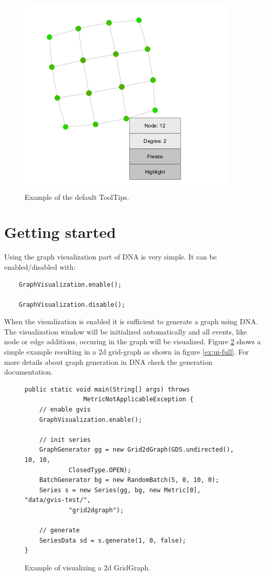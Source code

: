 \begin{figure} [h]
\centering
\includegraphics [scale=0.85] {images/tooltip}
\caption{Example of the default ToolTips.}
\label{fig:ToolTip}
\end{figure}

\section{Getting started}
\label{s:start}
Using the graph visualization part of DNA is very simple. It can be enabled/disabled with:
\begin{lstlisting}
	GraphVisualization.enable();
	
	GraphVisualization.disable();
\end{lstlisting}
When the visualization is enabled it is sufficient to generate a graph using DNA. The visualization window will be initialized automatically and all events, like node or edge additions, occuring in the graph will be visualized. Figure \ref{code:gridGraph} shows a simple example resulting in a 2d grid-graph as shown in figure \ref{ex:ui-full}. For more details about graph generation in DNA check the generation documentation.

\begin{figure} [h]
\begin{lstlisting}
public static void main(String[] args) throws
				MetricNotApplicableException {
	// enable gvis
	GraphVisualization.enable();
			
	// init series
	GraphGenerator gg = new Grid2dGraph(GDS.undirected(), 10, 10,
			ClosedType.OPEN);
	BatchGenerator bg = new RandomBatch(5, 0, 10, 0);
	Series s = new Series(gg, bg, new Metric[0], "data/gvis-test/",
			"grid2dgraph");
				
	// generate
	SeriesData sd = s.generate(1, 0, false);
}

\end{lstlisting}
\caption{Example of visualizing a 2d GridGraph.}
\label{code:gridGraph}
\end{figure}